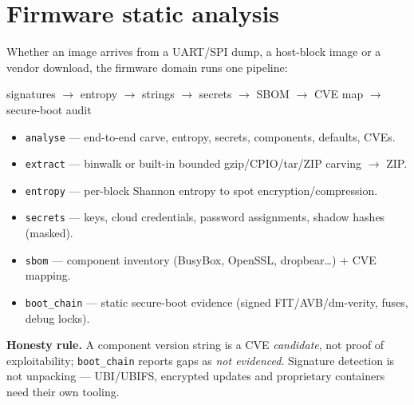 \documentclass[11pt]{article}
\newif\ifintable\intablefalse
\newcommand{\code}[1]{\ifintable\texttt{#1}\else{\small\colorbox{codebg}{\texttt{#1}}}\fi}
\begin{document}
\section{Firmware static analysis}
Whether an image arrives from a UART/SPI dump, a host-block image or a vendor
download, the firmware domain runs one pipeline:
\begin{codebox}\small\ttfamily signatures $\rightarrow$ entropy $\rightarrow$ strings $\rightarrow$ secrets $\rightarrow$ SBOM $\rightarrow$ CVE map $\rightarrow$ secure-boot audit\end{codebox}
\begin{itemize}
  \item \code{analyse} --- end-to-end carve, entropy, secrets, components, defaults, CVEs.
  \item \code{extract} --- binwalk or built-in bounded gzip/CPIO/tar/ZIP carving $\rightarrow$ ZIP.
  \item \code{entropy} --- per-block Shannon entropy to spot encryption/compression.
  \item \code{secrets} --- keys, cloud credentials, password assignments, shadow hashes (masked).
  \item \code{sbom} --- component inventory (BusyBox, OpenSSL, dropbear\dots) + CVE mapping.
  \item \code{boot\_chain} --- static secure-boot evidence (signed FIT/AVB/dm-verity, fuses, debug locks).
\end{itemize}
\begin{callout}
\textbf{Honesty rule.} A component version string is a CVE \emph{candidate}, not
proof of exploitability; \code{boot\_chain} reports gaps as \emph{not evidenced}.
Signature detection is not unpacking --- UBI/UBIFS, encrypted updates and
proprietary containers need their own tooling.
\end{callout}

\end{document}
